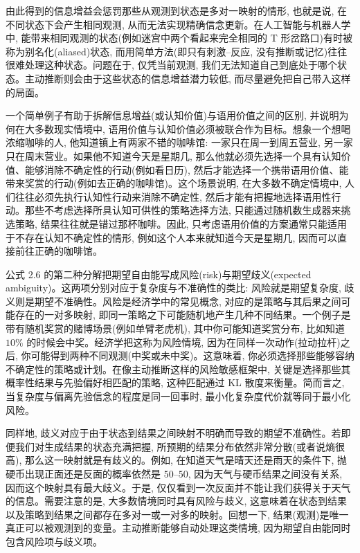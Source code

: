由此得到的信息增益会惩罚那些从观测到状态是多对一映射的情形, 也就是说, 在不同状态下会产生相同观测, 从而无法实现精确信念更新。在人工智能与机器人学中, 能带来相同观测的状态(例如迷宫中两个看起来完全相同的 T 形岔路口)有时被称为别名化(aliased)状态, 而用简单方法(即只有刺激--反应, 没有推断或记忆)往往很难处理这种状态。问题在于, 仅凭当前观测, 我们无法知道自己到底处于哪个状态。主动推断则会由于这些状态的信息增益潜力较低, 而尽量避免把自己带入这样的局面。

一个简单例子有助于拆解信息增益(或认知价值)与语用价值之间的区别, 并说明为何在大多数现实情境中, 语用价值与认知价值必须被联合作为目标。想象一个想喝浓缩咖啡的人, 他知道镇上有两家不错的咖啡馆: 一家只在周一到周五营业, 另一家只在周末营业。如果他不知道今天是星期几, 那么他就必须先选择一个具有认知价值、能够消除不确定性的行动(例如看日历), 然后才能选择一个携带语用价值、能带来奖赏的行动(例如去正确的咖啡馆)。这个场景说明, 在大多数不确定情境中, 人们往往必须先执行认知性行动来消除不确定性, 然后才能有把握地选择语用性行动。那些不考虑选择所具认知可供性的策略选择方法, 只能通过随机数生成器来挑选策略, 结果往往就是错过那杯咖啡。因此, 只考虑语用价值的方案通常只能适用于不存在认知不确定性的情形, 例如这个人本来就知道今天是星期几, 因而可以直接前往正确的咖啡馆。

公式 2.6 的第二种分解把期望自由能写成风险(risk)与期望歧义(expected ambiguity)。这两项分别对应于复杂度与不准确性的类比: 风险就是期望复杂度, 歧义则是期望不准确性。风险是经济学中的常见概念, 对应的是策略与其后果之间可能存在的一对多映射, 即同一策略之下可能随机地产生几种不同结果。一个例子是带有随机奖赏的赌博场景(例如单臂老虎机), 其中你可能知道奖赏分布, 比如知道 $10\%$ 的时候会中奖。经济学把这称为风险情境, 因为在同样一次动作(拉动拉杆)之后, 你可能得到两种不同观测(中奖或未中奖)。这意味着, 你必须选择那些能够容纳不确定性的策略或计划。在像主动推断这样的风险敏感框架中, 关键是选择那些其概率性结果与先验偏好相匹配的策略, 这种匹配通过 KL 散度来衡量。简而言之, 当复杂度与偏离先验信念的程度是同一回事时, 最小化复杂度代价就等同于最小化风险。

同样地, 歧义对应于由于状态到结果之间映射不明确而导致的期望不准确性。若即便我们对生成结果的状态充满把握, 所预期的结果分布依然非常分散(或者说熵很高), 那么这一映射就是有歧义的。例如, 在知道天气是晴天还是雨天的条件下, 抛硬币出现正面还是反面的概率依然是 $50$--$50$, 因为天气与硬币结果之间没有关系, 因而这个映射具有最大歧义。于是, 仅仅看到一次反面并不能让我们获得关于天气的信息。需要注意的是, 大多数情境同时具有风险与歧义, 这意味着在状态到结果以及策略到结果之间都存在多对一或一对多的映射。回想一下, 结果(观测)是唯一真正可以被观测到的变量。主动推断能够自动处理这类情境, 因为期望自由能同时包含风险项与歧义项。


